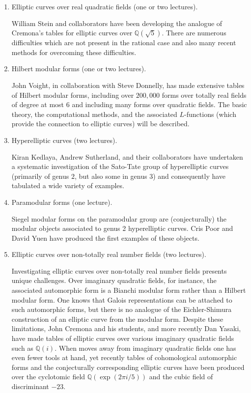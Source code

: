 \documentclass[12pt]{amsart}
\numberwithin{equation}{section}
\newcommand{\Q}{\mathbb Q}
\begin{document}
\begin{enumerate}
\item  Elliptic curves over real quadratic fields (one or two lectures).

\noindent
William Stein and collaborators have been developing the analogue of
Cremona's tables for elliptic curves over $\Q(\sqrt{5})$.  There are
numerous difficulties which are not present in the rational case
and also many recent methods for overcoming these difficulties.

\item Hilbert modular forms (one or two lectures).

\noindent
John Voight, in collaboration with Steve Donnelly, 
has made extensive tables of Hilbert modular forms,
including over $200{,}000$ forms over totally real fields of degree at
most $6$ and including 
many forms over quadratic fields.  The basic
theory, the computational methods, and the associated $L$-functions
(which provide the connection to elliptic curves) will be
described.

\item  Hyperelliptic curves (two lectures).

\noindent
Kiran Kedlaya, Andrew Sutherland, and their collaborators have
undertaken a systematic investigation of the Sato-Tate group of 
hyperelliptic curves (primarily of genus $2$, but also some in genus $3$)
and consequently have tabulated a wide variety
of examples.


\item  Paramodular forms (one lecture).

\noindent
Siegel modular forms on the paramodular group are (conjecturally) the
modular objects associated to genus 2 hyperelliptic curves.
Cris Poor and David Yuen have produced the first examples of these
objects.  

\item  Elliptic curves over non-totally real number fields (two lectures).

\noindent Investigating elliptic curves over non-totally real number
fields presents unique challenges.  Over imaginary quadratic fields,
for instance, the associated automorphic form is a Bianchi modular
form rather than a Hilbert modular form.  One knows that Galois
representations can be attached to such automorphic forms, but there
is no analogue of the Eichler-Shimura construction of an elliptic
curve from the modular form.  Despite these limitations, John Cremona
and his students, and more recently Dan Yasaki, have made tables of
elliptic curves over various imaginary quadratic fields such as
$\Q(i)$.  When moves away from imaginary quadratic fields one has even
fewer tools at hand, yet recently tables of cohomological automorphic
forms and the conjecturally corresponding elliptic curves have been
produced over the cyclotomic field $\Q (\exp (2\pi i/5))$ and the
cubic field of discriminant $-23$.


\end{enumerate}
\end{document}
